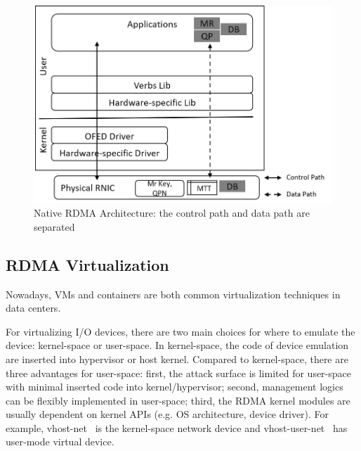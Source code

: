 \begin{figure}[!ht]
	\centering
	\includegraphics[width=0.8\linewidth]{images/rdma-feat.png}
	\caption{Native RDMA Architecture: the control path and data path are separated}
	\label{fig:rdma-feat}
\end{figure}

\subsection{RDMA Virtualization}
Nowadays, VMs and containers are both common virtualization techniques in data centers.

For virtualizing I/O devices, there are two main choices for where to emulate the device: kernel-space or user-space. In kernel-space, the code of device emulation are inserted into hypervisor or host kernel. Compared to kernel-space, there are three advantages for user-space: first, the attack surface is limited for user-space with minimal inserted code into kernel/hypervisor; second, management logics can be flexibly implemented in user-space; third, the RDMA kernel modules are usually dependent on kernel APIs (e.g. OS architecture, device driver). For example, vhost-net~\cite{vhost-net} is the kernel-space network device and vhost-user-net~\cite{vhost-user-net} has user-mode virtual device.